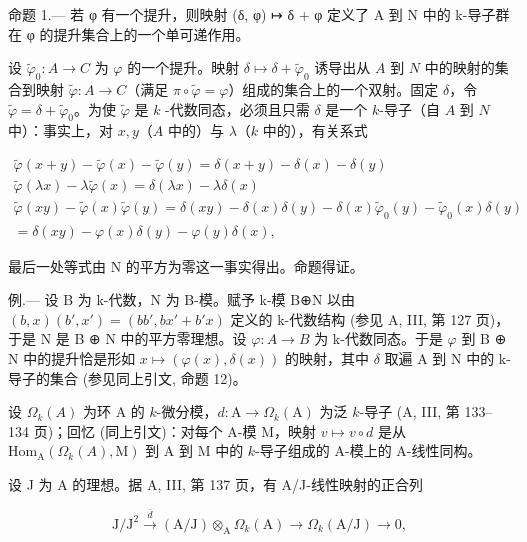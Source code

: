 命题 1.--- 若 φ 有一个提升，则映射 (δ, φ) ↦ δ + φ 定义了 A 到 N 中的 k-导子群在 φ 的提升集合上的一个单可递作用。

设 \(\tilde{\varphi}_{0}: A \to C\) 为 \(\varphi\) 的一个提升。映射 \(\delta \mapsto \delta + \tilde{\varphi}_{0}\) 诱导出从 \(A\) 到 \(N\) 中的映射的集合到映射 \(\tilde{\varphi}: A \to C\)（满足 \(\pi \circ \tilde{\varphi} = \varphi\)）组成的集合上的一个双射。固定 \(\delta\)，令 \(\tilde{\varphi} = \delta + \tilde{\varphi}_{0}\)。为使 \(\tilde{\varphi}\) 是 \(k\) -代数同态，必须且只需 \(\delta\) 是一个 \(k\)-导子（自 \(A\) 到 \(N\) 中）：事实上，对 \(x, y\)（\(A\) 中的）与 \(\lambda\)（\(k\) 中的），有关系式

\[
\begin{array}{c} \tilde {\varphi} (x + y) - \tilde {\varphi} (x) - \tilde {\varphi} (y) = \delta (x + y) - \delta (x) - \delta (y) \\ \tilde {\varphi} (\lambda x) - \lambda \tilde {\varphi} (x) = \delta (\lambda x) - \lambda \delta (x) \\ \tilde {\varphi} (x y) - \tilde {\varphi} (x) \tilde {\varphi} (y) = \delta (x y) - \delta (x) \delta (y) - \delta (x) \tilde {\varphi} _ {0} (y) - \tilde {\varphi} _ {0} (x) \delta (y) \\ = \delta (x y) - \varphi (x) \delta (y) - \varphi (y) \delta (x), \end{array}
\]

最后一处等式由 N 的平方为零这一事实得出。命题得证。

例.--- 设 B 为 k-代数，N 为 B-模。赋予 k-模 B⊕N 以由 \((b,x)(b',x') = (bb',bx' + b'x)\) 定义的 k-代数结构 (参见 A, III, 第 127 页)，于是 N 是 B ⊕ N 中的平方零理想。设 \(\varphi : A \to B\) 为 k-代数同态。于是 \(\varphi\) 到 B ⊕ N 中的提升恰是形如 \(x \mapsto (\varphi(x), \delta(x))\) 的映射，其中 \(\delta\) 取遍 A 到 N 中的 k-导子的集合 (参见同上引文, 命题 12)。

设 \(\Omega_{k}(A)\) 为环 A 的 \(k\)-微分模，\(d: \mathrm{A} \longrightarrow \Omega_{k}(\mathrm{A})\) 为泛 \(k\)-导子 (A, III, 第 133–134 页)；回忆 (同上引文)：对每个 A-模 M，映射 \(v \mapsto v \circ d\) 是从 \(\mathrm{Hom}_{\mathrm{A}}(\Omega_{k}(A), \mathrm{M})\) 到 A 到 M 中的 \(k\)-导子组成的 A-模上的 A-线性同构。

设 J 为 A 的理想。据 A, III, 第 137 页，有 A/J-线性映射的正合列

\[
\mathrm{J} / \mathrm{J} ^ {2} \stackrel {\bar {d}} {\longrightarrow} (\mathrm{A} / \mathrm{J}) \otimes_ {\mathrm{A}} \Omega_ {k} (\mathrm{A}) \longrightarrow \Omega_ {k} (\mathrm{A} / \mathrm{J}) \rightarrow 0,
\]

